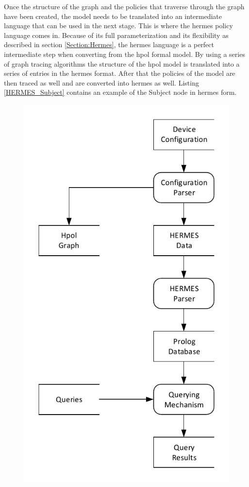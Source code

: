 \documentclass[12pt,letterpaper]{report}
\begin{document}
Once the structure of the graph and the policies that traverse through the graph have been created, the model needs to be translated into an intermediate language that can be used in the next stage. This is where the \ac{hermes} policy language comes in. Because of its full parameterization and its flexibility as described in section \ref{Section:Hermes}, the \ac{hermes} language is a perfect intermediate step when converting from the \ac{hpol} formal model. By using a series of graph tracing algorithms the structure of the \ac{hpol} model is translated into a series of entries in the \ac{hermes} format. After that the policies of the model are then traced as well and are converted into \ac{hermes} as well. Listing \ref{HERMES_Subject} contains an example of the Subject node in \ac{hermes} form.

\begin{figure}
	\centering
	\includegraphics[height=.9\textheight]{ImageV2.pdf}

\end{figure}
\end{document}
